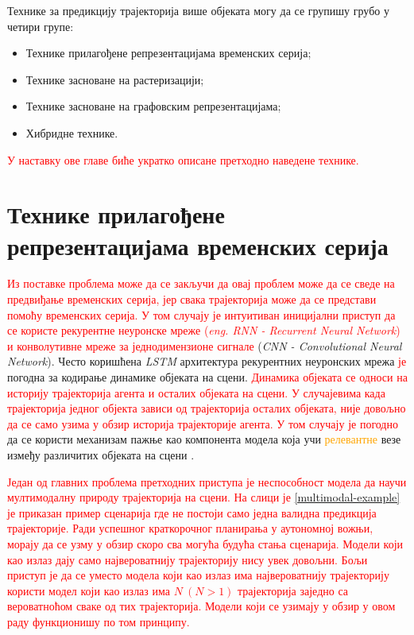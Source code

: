\documentclass[11pt,oneside]{memoir}
\begin{document}
Технике за предикцију трајекторија више објеката могу да се групишу грубо у четири групе:
\begin{itemize}
  \item Технике прилагођене репрезентацијама временских серија;
  \item Технике засноване на растеризацији;
  \item Технике засноване на графовским репрезентацијама;
  \item Хибридне технике.
\end{itemize}

\textcolor{red}{У наставку ове главе биће укратко описане претходно наведене технике.}

\section{Технике прилагођене репрезентацијама временских серија}

\textcolor{red}{Из поставке проблема може да се закључи да овај проблем може да се сведе на предвиђање временских серија, јер свака 
трајекторија може да се представи помоћу временских серија. У том случају је интуитиван иницијални приступ да се користе рекурентне неуронске мреже 
(\textit{eng. RNN - Recurrent Neural Network}) и конволутивне мреже за једнодимензионе сигнале} (\textit{CNN - Convolutional Neural Network}). 
Често коришћена \textit{LSTM} архитектура рекурентних неуронских мрежа \textcolor{red}{је} погодна за кодирање динамике објеката на сцени. 
\textcolor{red}{Динамика објеката се односи на историју трајекторија агента и осталих објеката на сцени.} 
\textcolor{red}{У случајевима када трајекторија једног објекта зависи од трајекторија осталих објеката, није довољно да се само узима у обзир
историја трајекторије агента. У том случају је погодно} да се користи механизам пажње као компонента модела која учи 
\textcolor{orange}{релевантне} везе између различитих објеката на сцени \cite{argoverse, social_lstm, attention_is_all_you_need}. 

\textcolor{red}{Један од главних проблема претходних приступа је неспособност модела да научи мултимодалну природу трајекторија на сцени. На слици
је \ref{multimodal-example} је приказан пример сценарија где не постоји само једна валидна предикција трајекторије. 
Ради успешног краткорочног планирања у аутономној вожњи, морају да се узму у обзир скоро сва могућа будућа стања сценарија. Модели
који као излаз дају само највероватнију трајекторију нису увек довољни. Бољи приступ је да се уместо модела који као излаз има највероватнију трајекторију користи
модел који као излаз има $N\ (N > 1)$ трајекторија заједно са вероватноћом сваке од тих трајекторија. Модели који се узимају у обзир у овом раду функционишу
по том принципу. }
\end{document}
